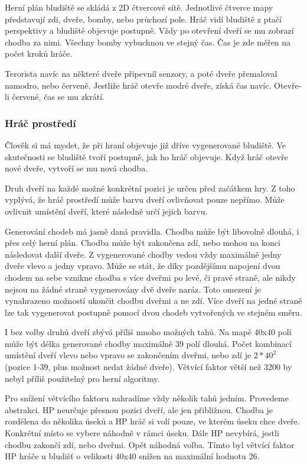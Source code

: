 Herní plán bludiště se skládá z 2D čtvercové sítě. Jednotlivé čtverce mapy představují zdi, dveře, bomby, nebo průchozí pole. Hráč vidí bludiště z ptačí perspektivy a bludiště objevuje postupně. Vždy po otevření dveří se mu zobrazí chodba za nimi. Všechny bomby vybuchnou ve stejný čas. Čas je zde měřen na počet kroků hráče.

Terorista navíc na některé dveře připevnil senzory, a poté dveře přemaloval namodro, nebo červeně. Jestliže hráč otevře modré dveře, získá čas navíc. Otevře-li červené, čas se mu zkrátí.

\subsubsection{Hráč prostředí}

Člověk si má myslet, že při hraní objevuje již dříve vygenerované bludiště. Ve skutečnosti se bludiště tvoří postupně, jak ho hráč objevuje. Když hráč otevře nové dveře, vytvoří se mu nová chodba. 

Druh dveří na každé možné konkrétní pozici je určen před začátkem hry. Z toho vyplývá, že hráč prostředí může barvu dveří ovlivňovat pouze nepřímo. Může ovlivnit umístění dveří, které následně určí jejich barvu.

Generování chodeb má jasně daná pravidla. Chodba může být libovolně dlouhá, i přes celý herní plán. Chodba může být zakončena zdí, nebo mohou na konci následovat další dveře. Z vygenerované chodby vedou vždy maximálně jedny dveře vlevo a jedny vpravo. Může se stát, že díky pozdějšímu napojení dvou chodem na sebe vznikne chodba s více dveřmi po levé, či pravé straně, ale nikdy nejsou na žádné straně vygenerovány dvě dveře naráz. Toto omezení je vynahrazeno možností ukončit chodbu dveřmi a ne zdí. Více dveří na jedné straně lze tak vygenerovat postupně pomocí dvou chodeb vytvořených ve stejném směru.

I bez volby druhů dveří zbývá příliš mnoho možných tahů. Na mapě 40x40 polí může být délka generované chodby maximálně 39 polí dlouhá. Počet kombinací umístění dveří vlevo nebo vpravo se zakončením dveřmi, nebo zdí je $2*40^2$ (pozice 1-39, plus možnost nedat žádné dveře). Větvící faktor větší než 3200 by nebyl příliš použitelný pro herní algoritmy. 

Pro snížení větvícího faktoru nahradíme vždy několik tahů jedním. Provedeme abstrakci. HP neurčuje přesnou pozici dveří, ale jen přibližnou. Chodba je rozdělena do několika úseků a HP hráč si volí pouze, ve kterém úseku chce dveře. Konkrétní místo se vybere náhodně v rámci úseku. Dále HP nevybírá, jestli chodbu zakončí zdí, nebo dveřmi. Opět náhodná volba. Tímto byl větvící faktor HP hráče u bludišť o velikosti 40x40 snížen na maximální hodnotu 26.

